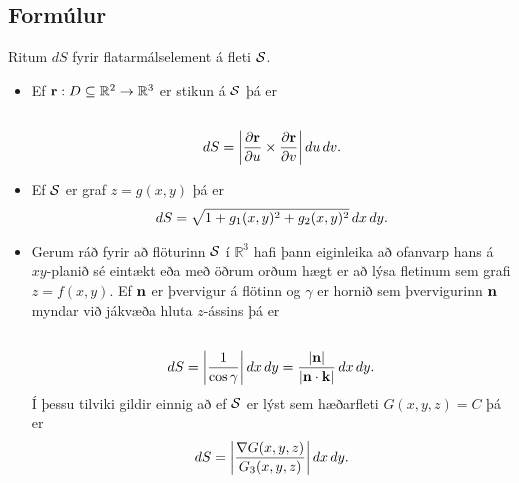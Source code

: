 \documentclass[a4paper,10pt,icelandic]{sphinxmanual}
\begin{document}
\subsection{Formúlur}
\label{Kafli5:formulur}
Ritum \(dS\) fyrir flatarmálselement á fleti \(\cal S\).
\begin{itemize}
\item {} 
Ef
\(\mbox{${\bf r}$}:D\subseteq{\mathbb  R}^2\rightarrow {\mathbb  R}^3\)
er stikun á \(\cal S\) þá er
\begin{gather}
\begin{split}\displaystyle\end{split}\notag\\\begin{split}dS=\bigg|\frac{\partial \mbox{${\bf r}$}}{\partial u}\times\frac{\partial
  \mbox{${\bf r}$}}{\partial v}\bigg|\,du\,dv.\end{split}\notag
\end{gather}
\item {} 
Ef \(\cal S\) er graf \(z=g(x,y)\) þá er
\begin{gather}
\begin{split}\displaystyle dS=\sqrt{1+g_1(x,y)^2+g_2(x,y)^2}\,dx\,dy.\end{split}\notag
\end{gather}
\item {} 
Gerum ráð fyrir að flöturinn \(\cal S\) í \({\mathbb  R}^3\)
hafi þann eiginleika að ofanvarp hans á \(xy\)-planið sé eintækt
eða með öðrum orðum hægt er að lýsa fletinum sem grafi
\(z=f(x,y)\). Ef \(\mbox{${\bf n}$}\) er þvervigur á flötinn
og \(\gamma\) er hornið sem þvervigurinn \(\mbox{${\bf n}$}\)
myndar við jákvæða hluta \(z\)-ássins þá er
\begin{gather}
\begin{split}\displaystyle\end{split}\notag\\\begin{split}dS=\bigg|\frac{1}{\cos\gamma}\bigg|\,dx\,dy
=\frac{|\mbox{${\bf n}$}|}{|\mbox{${\bf n}$}\cdot\mbox{${\bf k}$}|}\,dx\,dy.\end{split}\notag
\end{gather}
Í þessu tilviki gildir einnig að ef \(\cal S\) er lýst sem
hæðarfleti \(G(x,y,z)=C\) þá er
\begin{gather}
\begin{split}\displaystyle dS=\bigg|\frac{\nabla G(x,y,z)}{G_3(x,y,z)}\bigg|\,dx\,dy.\end{split}\notag
\end{gather}
\end{itemize}
\end{document}
